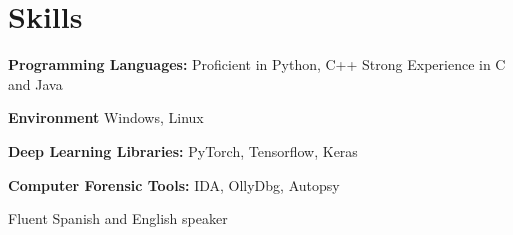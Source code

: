 \documentclass[12pt,a4paper,roman]{moderncv}        %
\makeatletter
\renewcommand*{\bibliographyitemlabel}{\@biblabel{\arabic{enumiv}}}
\makeatother
\begin{document}
\section{Skills}

\textbf{Programming Languages:} Proficient in Python, C++ Strong Experience in C and Java
\vspace{2pt}

\textbf{Environment} Windows, Linux
\vspace{2pt}
	
\textbf{Deep Learning Libraries:} PyTorch, Tensorflow, Keras
\vspace{2pt}
	
\textbf{Computer Forensic Tools:} IDA, OllyDbg, Autopsy
\vspace{2pt}
	
Fluent Spanish and English speaker
\vspace{2pt}

\nocite{*}



\end{document}
